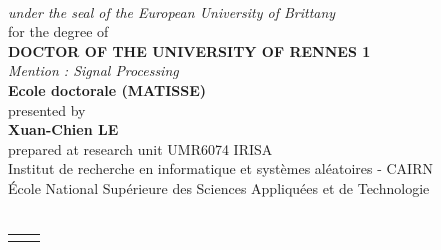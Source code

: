 \documentclass[10pt]{book}
\begin{document}
\begin{titlepage}
\begin{center}
\begin{minipage}{\glarg}
\\ \vspace{0mm}\emph{\Large under the seal of the European University of Brittany}\\ \vspace{0.5cm}
{\Large for the degree of}\\ \vspace{1.5mm}
{\Large\bf DOCTOR OF THE UNIVERSITY OF RENNES 1}\\ \vspace{0.4cm}
\emph{\Large Mention : Signal Processing}\\ \vspace{2mm}
{\Large\bf Ecole doctorale (MATISSE)}\\ \vspace{0.3cm}
{\Large presented by} \\ \vspace{3mm}
{\Huge\bf Xuan-Chien LE}\\ \vspace{0.4cm}
{\Large prepared at research unit UMR6074 IRISA\\
\hspace{-1cm}Institut de recherche en informatique et syst\`emes al\'eatoires - CAIRN\\
\hspace{-1cm}\'Ecole National Sup\'erieure des Sciences Appliqu\'ees et de Technologie}\vspace{0.3cm}
\\
\hspace{-20mm}{\rule{\Glarg}{1pt}}\\
\vspace{6mm}

\begin{tabular}{p{7cm}p{10cm}}
\begin{minipage}{\plarg}
\hspace{-1.8cm}{\huge\bf Improving Performance of }\vspace{5mm}

\hspace{-1.8cm}{\huge\bf Non-Intrusive }\vspace{5mm}

\hspace{-1.8cm}{\huge\bf Load Monitoring with }\vspace{5mm}


\end{minipage}
\end{tabular}
\end{minipage}
\end{center}
\end{titlepage}
\end{document}
